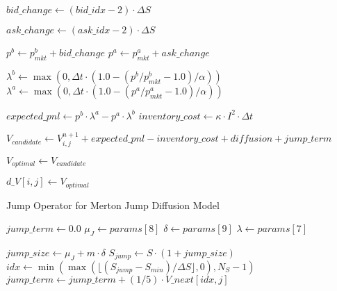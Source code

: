 \documentclass[twocolumn,11pt]{IEEEtran}  %
\begin{document}
\begin{onecolumn}
\begin{onecolumn}
\begin{algorithm}
\begin{algorithmic}[1]
     
        \State $bid\_change \gets (bid\_idx - 2) \cdot \Delta S$
        
            \State $ask\_change \gets (ask\_idx - 2) \cdot \Delta S$
            
            \State $p^b \gets p^b_{mkt} + bid\_change$
            \State $p^a \gets p^a_{mkt} + ask\_change$
            
             
            
                \State $\lambda^b \gets \max(0, \Delta t \cdot (1.0 - (p^b/p^b_{mkt} - 1.0)/\alpha))$
                \State $\lambda^a \gets \max(0, \Delta t \cdot (1.0 - (p^a/p^a_{mkt} - 1.0)/\alpha))$
                
                \State $expected\_pnl \gets p^b \cdot \lambda^a - p^a \cdot \lambda^b$
                \State $inventory\_cost \gets \kappa \cdot I^2 \cdot \Delta t$
                
                \State $V_{candidate} \gets V^{n+1}_{i,j} + expected\_pnl - inventory\_cost + diffusion + jump\_term$
                
                    \State $V_{optimal} \gets V_{candidate}$
                \EndIf
            \EndIf
        \EndFor
    \EndFor
    
    \State $d\_V[i,j] \gets V_{optimal}$
\EndIf
\end{algorithmic}
\end{algorithm}


\begin{algorithm}
\caption{Jump Operator for Merton Jump Diffusion Model}
\begin{algorithmic}[1]
    \State $jump\_term \gets 0.0$
    \State $\mu_J \gets params[8]$ 
    \State $\delta \gets params[9]$ 
    \State $\lambda \gets params[7]$ 
    
     
        \State $jump\_size \gets \mu_J + m \cdot \delta$
        \State $S_{jump} \gets S \cdot (1 + jump\_size)$
        \State $idx \gets \min(\max(\lfloor(S_{jump} - S_{min})/\Delta S\rfloor, 0), N_S-1)$
        \State $jump\_term \gets jump\_term + (1/5) \cdot V\_next[idx,j]$
    \EndFor
    

\end{algorithmic}
\end{algorithm}
\end{onecolumn}
\end{onecolumn}
\end{document}
